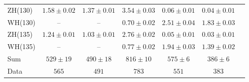 \documentclass[11pt,twoside,a4paper,cmspaper,final,collab]{cms-tdr}
\begin{document}
\begin{table}[tbp]
\begin{center}
{\begin{tabular}{lcccccc}
ZH(130) & $1.58 \pm 0.02$ & $1.37 \pm 0.01$ & $3.54\pm 0.03$ & $0.06\pm 0.01$ & $0.04\pm 0.01$ \\
WH(130) & -- & -- & $0.70\pm 0.02$ & $2.51\pm 0.04$ & $1.83\pm 0.03$   \\
ZH(135) & $1.24 \pm 0.01$ & $1.03 \pm 0.01$ & $2.76\pm 0.02$ & $0.05\pm 0.01$ & $0.03\pm 0.01$ \\
WH(135) & -- & -- & $0.77\pm 0.02$ & $1.94\pm 0.03$ & $1.39\pm 0.02$   \\
\hline
Sum & $529 \pm 19$ & $490 \pm 18$ & $816 \pm 10$ & $575\pm 6$ & $386\pm 6$ \\\hline
Data &    $565$ &   $491$ & $783$ & $551$& $383$ \\\hline
\end{tabular}
}
\end{center}
\end{table}
\end{document}
